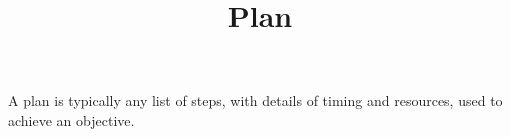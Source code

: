 \documentclass[a4paper]{article}
\title{Plan}
\date{}
\begin{document}
\maketitle
    A plan is typically any list of steps, with details of timing and resources, used to achieve an objective. 
\end{document}
